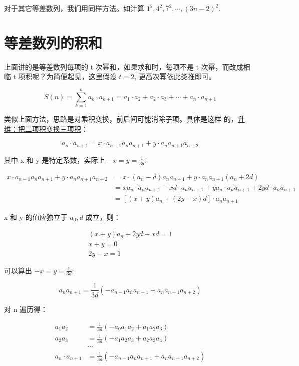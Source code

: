 对于其它等差数列，我们用同样方法。如计算 $1^2, 4^2, 7^2, \cdots,
(3n - 2)^2$.

\section{等差数列的积和}

上面讲的是等差数列每项的 t 次幂和，如果求和时，每项不是 t 次幂，而改成相临
t 项积呢？为简便起见，这里假设 $t = 2$, 更高次幂依此类推即可。

\[
  S(n) = \sum_{k = 1}^n a_k \cdot a_{k+1} = a_1 \cdot a_2 + a_2 \cdot a_3 + \cdots + a_n \cdot
  a_{n+1}
\]

类似上面方法，思路是对乘积变换，前后间可能消除子项。具体是这样
的，\uline{升维：把二项积变换三项积}：

\[
  a_n \cdot a_{n + 1} = x \cdot a_{n - 1} a_n a_{n + 1} + y \cdot
  a_n a_{n + 1} a_{n + 2}
\]

其中 x 和 y 是特定系数，实际上 $-x = y = \frac{1}{3d}$:

\[
  \begin{aligned}
    x \cdot a_{n - 1} a_n a_{n + 1} + y \cdot a_n a_{n + 1}
    a_{n + 2}
    &= x \cdot (a_n - d) a_n a_{n + 1} + y \cdot a_n a_{n + 1}
    (a_n + 2d) \\
    &= x a_n \cdot a_n a_{n + 1} - xd \cdot a_n a_{n + 1}
    + y a_n \cdot a_n a_{n + 1} + 2yd \cdot a_n a_{n + 1} \\
    &= [(x + y)a_n + (2y - x)d] \cdot a_n a_{n + 1}
  \end{aligned}
\]

x 和 y 的值应独立于 $a_0, d$ 成立，则：

\[
  \begin{aligned}
    (x + y)a_n + 2yd - xd = 1 \\
    x + y = 0 \\
    2y - x = 1
  \end{aligned}
\]

可以算出 $-x = y = \frac{1}{3d}$:

\[
  a_n a_{n + 1} = \frac{1}{3d}( -a_{n - 1} a_n a_{n + 1} +
  a_n a_{n + 1} a_{n + 2} )
\]

对 n 遍历得：

\[
  \begin{aligned}
    a_1a_2 &= \frac{1}{3d}(-a_0a_1a_2 + a_1a_2a_3) \\
    a_2a_3 &= \frac{1}{3d}(-a_1a_2a_3 + a_2a_3a_4) \\
    & \cdots \\
    a_n \cdot a_{n + 1} &= \frac{1}{3d}( -a_{n - 1} a_n a_{n + 1} +
  a_n a_{n + 1} a_{n + 2} )
  \end{aligned}
\]

